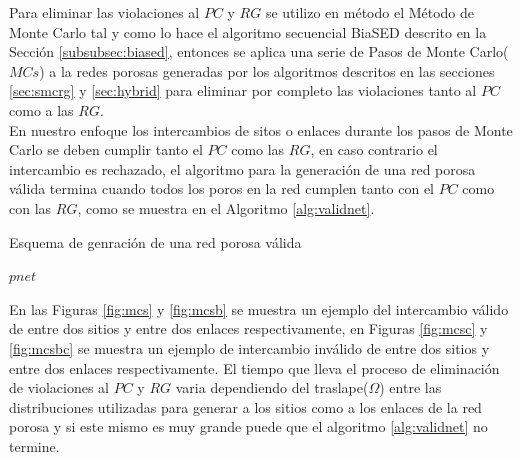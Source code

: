 

Para eliminar las violaciones al $PC$ y $RG$ se utilizo en método el Método de Monte Carlo tal y como lo hace el algoritmo secuencial BiaSED descrito en la Sección \ref{subsubsec:biased}, entonces se aplica una serie de Pasos de Monte Carlo($MCs$) a la redes porosas generadas por los algoritmos descritos en las secciones \ref{sec:smcrg} y \ref{sec:hybrid} para eliminar por completo las violaciones tanto al $PC$ como a las $RG$.\\

En nuestro enfoque los intercambios de sitos o enlaces durante los pasos de Monte Carlo se deben cumplir tanto el $PC$ como las $RG$, en caso contrario el intercambio es rechazado, el algoritmo para la generación de una red porosa válida termina cuando todos los poros en la red cumplen tanto con el $PC$ como con las $RG$, como se muestra en el Algoritmo \ref{alg:validnet}.\\

\begin{algorithm}
\caption{Esquema de genración de una red porosa válida}\label{alg:validnet}
\begin{algorithmic}[1]
\Require $pnet$
	\State {}
		\State {}
	\EndIf
\EndWhile
\end{algorithmic}
\end{algorithm}

En las Figuras \ref{fig:mcs} y \ref{fig:mcsb} se muestra un ejemplo del intercambio válido de entre dos sitios y entre dos enlaces respectivamente, en Figuras \ref{fig:mcsc} y \ref{fig:mcsbc} se muestra un ejemplo de intercambio inválido de entre dos sitios y entre dos enlaces respectivamente. El tiempo que lleva el proceso de eliminación de violaciones al $PC$ y $RG$ varia dependiendo del traslape($\Omega$) entre las distribuciones utilizadas para generar a los sitios como a los enlaces de la red porosa y si este mismo es muy grande puede que el algoritmo \ref{alg:validnet} no termine.


